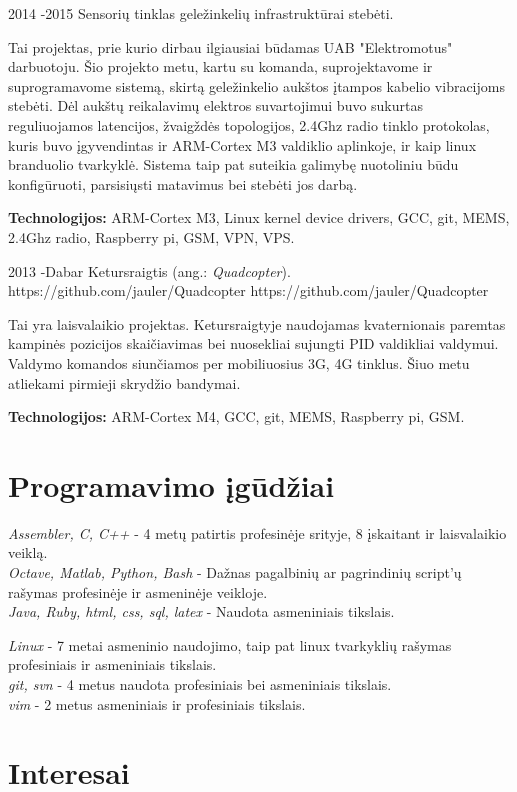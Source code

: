 \documentclass[12]{article}
\begin{document}
\job
{2014 -}{2015}
{Sensorių tinklas geležinkelių infrastruktūrai stebėti.}
{}
{}
{
Tai projektas, prie kurio dirbau ilgiausiai būdamas UAB "Elektromotus" darbuotoju.
Šio projekto metu, kartu su komanda, suprojektavome ir suprogramavome sistemą, skirtą geležinkelio aukštos įtampos kabelio vibracijoms stebėti.
Dėl aukštų reikalavimų elektros suvartojimui buvo sukurtas reguliuojamos latencijos, žvaigždės topologijos, 2.4Ghz radio tinklo protokolas, kuris buvo įgyvendintas ir ARM-Cortex M3 valdiklio aplinkoje, ir kaip linux branduolio tvarkyklė.
Sistema taip pat suteikia galimybę nuotoliniu būdu konfigūruoti, parsisiųsti matavimus bei stebėti jos darbą.\\
\rule{0mm}{5mm}\textbf{Technologijos:} ARM-Cortex M3, Linux kernel device drivers, GCC, git, MEMS, 2.4Ghz radio, Raspberry pi, GSM, VPN, VPS.}

\job
{2013 -}{Dabar}
{Ketursraigtis (ang.: \textit{Quadcopter}).}
{https://github.com/jauler/Quadcopter}
{https://github.com/jauler/Quadcopter}
{Tai yra laisvalaikio projektas.
Ketursraigtyje naudojamas kvaternionais paremtas kampinės pozicijos skaičiavimas bei nuosekliai sujungti PID valdikliai valdymui.
Valdymo komandos siunčiamos per mobiliuosius 3G, 4G tinklus.
Šiuo metu atliekami pirmieji skrydžio bandymai.\\
\rule{0mm}{5mm}\textbf{Technologijos:} ARM-Cortex M4, GCC, git, MEMS, Raspberry pi, GSM.}


\section{Programavimo įgūdžiai}

{
	\textit{Assembler, C, C++} - 4 metų patirtis profesinėje srityje, 8 įskaitant ir laisvalaikio veiklą.\\
	\textit{Octave, Matlab, Python, Bash} - Dažnas pagalbinių ar pagrindinių script'ų rašymas profesinėje ir asmeninėje veikloje.\\
	\textit{Java, Ruby, html, css, sql, latex} - Naudota asmeniniais tikslais. \\

}

{
	\textit{Linux} - 7 metai asmeninio naudojimo, taip pat linux tvarkyklių rašymas profesiniais ir asmeniniais tikslais.\\
	\textit{git, svn} - 4 metus naudota profesiniais bei asmeniniais tikslais.\\
	\textit{vim} - 2 metus asmeniniais ir profesiniais tikslais.\\
}


\section{Interesai}

\end{document}
